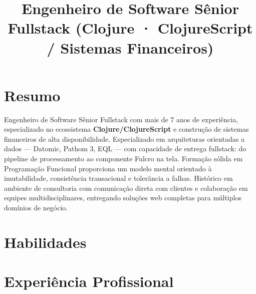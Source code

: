 \documentclass[10pt,a4paper,sans]{moderncv}
\title{Engenheiro de Software Sênior Fullstack (Clojure · ClojureScript / Sistemas Financeiros)}
\begin{document}
\makecvtitle

\section{Resumo}
Engenheiro de Software Sênior Fullstack com mais de 7 anos de experiência, especializado no ecossistema \textbf{Clojure/ClojureScript} e construção de sistemas financeiros de alta disponibilidade. Especializado em arquiteturas orientadas a dados --- Datomic, Pathom 3, EQL --- com capacidade de entrega fullstack: do pipeline de processamento ao componente Fulcro na tela. Formação sólida em Programação Funcional proporciona um modelo mental orientado à imutabilidade, consistência transacional e tolerância a falhas. Histórico em ambiente de consultoria com comunicação direta com clientes e colaboração em equipes multidisciplinares, entregando soluções web completas para múltiplos domínios de negócio.

\section{Habilidades}

\section{Experiência Profissional}
\end{document}
